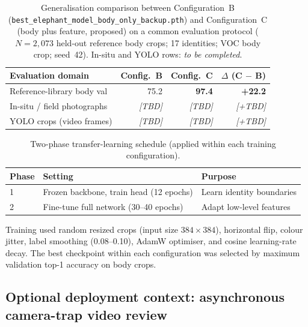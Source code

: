 \documentclass[preprint,12pt,3p,times]{elsarticle}
\begin{document}
\begin{table}[t]
  \centering
  \caption{Generalisation comparison between Configuration~B (\texttt{best\_elephant\_model\_body\_only\_backup.pth}) and Configuration~C (body plus feature, proposed) on a common evaluation protocol ($N{=}2{,}073$ held-out reference body crops; 17 identities; VOC body crop; seed~42). In-situ and YOLO rows: \textit{to be completed}.}
  \label{tab:generalization}
  \begin{tabular}{@{}lrrr@{}}
    \toprule
    Evaluation domain & Config.\ B & Config.\ C & $\Delta$ (C $-$ B) \\
    \midrule
    Reference-library body val & 75.2 & \textbf{97.4} & \textbf{+22.2} \\
    In-situ / field photographs & \textit{[TBD]} & \textit{[TBD]} & \textit{[+TBD]} \\
    YOLO crops (video frames) & \textit{[TBD]} & \textit{[TBD]} & \textit{[+TBD]} \\
    \bottomrule
  \end{tabular}
\end{table}

\begin{table}[t]
  \centering
  \caption{Two-phase transfer-learning schedule (applied within each training configuration).}
  \label{tab:training}
  \begin{tabular}{@{}lll@{}}
    \toprule
    Phase & Setting & Purpose \\
    \midrule
    1 & Frozen backbone, train head (12 epochs) & Learn identity boundaries \\
    2 & Fine-tune full network (30--40 epochs) & Adapt low-level features \\
    \bottomrule
  \end{tabular}
\end{table}

Training used random resized crops (input size $384\times384$), horizontal flip, colour jitter, label smoothing (0.08--0.10), AdamW optimiser, and cosine learning-rate decay. The best checkpoint within each configuration was selected by maximum validation top-1 accuracy on body crops.

\subsection{Optional deployment context: asynchronous camera-trap video review}
\label{sec:deployment}
\end{document}
